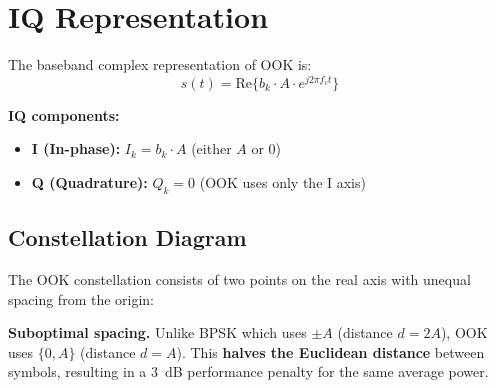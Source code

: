 \section{IQ Representation}

The baseband complex representation of OOK is:
\begin{equation}
s(t) = \mathrm{Re}\{b_k \cdot A \cdot e^{j2\pi f_c t}\}
\end{equation}

\textbf{IQ components:}
\begin{itemize}
\item \textbf{I (In-phase):} $I_k = b_k \cdot A$ (either $A$ or $0$)
\item \textbf{Q (Quadrature):} $Q_k = 0$ (OOK uses only the I axis)
\end{itemize}

\subsection{Constellation Diagram}

The OOK constellation consists of two points on the real axis with unequal spacing from the origin:

\begin{center}
\end{center}

\begin{warningbox}
\textbf{Suboptimal spacing.} Unlike BPSK which uses $\pm A$ (distance $d = 2A$), OOK uses $\{0, A\}$ (distance $d = A$). This \textbf{halves the Euclidean distance} between symbols, resulting in a 3~dB performance penalty for the same average power.
\end{warningbox}

